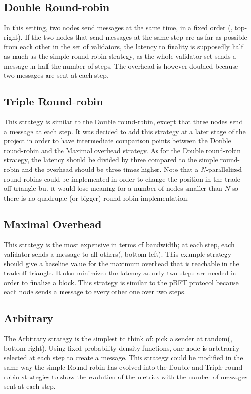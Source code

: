 \subsection{Double Round-robin}
In this setting, two nodes send messages at the same time, in a fixed order
(, top-right). If the two nodes that send messages at the
same step are as far as possible from each other in the set of validators, the
latency to finality is supposedly half as much as the simple round-robin
strategy, as the whole validator set sends a message in half the number of
steps. The overhead is however doubled because two messages are sent at each
step.

\subsection{Triple Round-robin}
This strategy is similar to the Double round-robin, except that three nodes send
a message at each step. It was decided to add this strategy at a later stage of
the project in order to have intermediate comparison points between the Double
round-robin and the Maximal overhead strategy. As for the Double round-robin
strategy, the latency should be divided by three compared to the simple
round-robin and the overhead should be three times higher.
Note that a \(N\)-parallelized round-robins could be implemented in order to change the
position in the trade-off triangle but it would lose meaning for a number of
nodes smaller than \(N\) so there is no quadruple (or bigger) round-robin
implementation.

\subsection{Maximal Overhead}
This strategy is the most expensive in terms of bandwidth; at each step, each
validator sends a message to all others(, bottom-left). This
example strategy should give a baseline value for the maximum overhead that is
reachable in the tradeoff triangle. It also minimizes the latency as only two
steps are needed in order to finalize a block. This strategy is similar to the
pBFT\cite{pBFT} protocol because each node sends a message to every other one
over two steps.

\subsection{Arbitrary}
The Arbitrary strategy is the simplest to think of: pick a sender at
random(, bottom-right).  Using fixed probability density
functions, one node is arbitrarily selected at each step to create a message.
This strategy could be modified in the same way the simple Round-robin has
evolved into the Double and Triple round robin strategies to show the evolution
of the metrics with the number of messages sent at each step.

